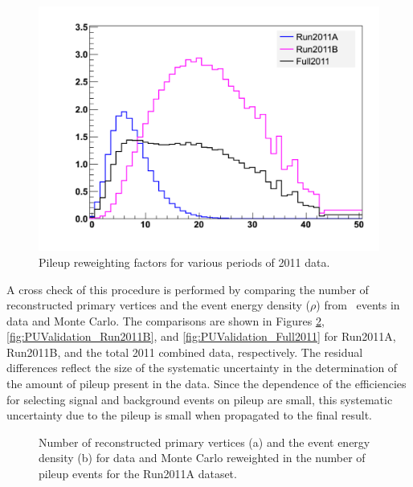 \begin{figure}[hbt]
\begin{center}
\includegraphics[width=0.7\linewidth]{figures/ReweightingFactors.pdf}
\caption{\label{fig:PUReweightingFactors} Pileup reweighting factors for various periods of 2011 data.}
\end{center}
\end{figure}


A cross check of this procedure is performed by comparing the number of 
reconstructed primary vertices and the event energy density ($\rho$)
from \zmm\ events in data and Monte Carlo. The comparisons are shown in
Figures \ref{fig:PUValidation_Run2011A},\ref{fig:PUValidation_Run2011B},
and \ref{fig:PUValidation_Full2011} for Run2011A, Run2011B, and the 
total 2011 combined data, respectively. The residual differences 
reflect the size of the systematic uncertainty in the determination 
of the amount of pileup present in the data. Since the dependence 
of the efficiencies for selecting signal and background events on 
pileup are small, this systematic uncertainty due to the pileup 
is small when propagated to the final 
result.

\begin{figure}[hbt]
\begin{center}
\caption{\label{fig:PUValidation_Run2011A} Number of reconstructed primary vertices (a) and
the event energy density (b) for data and Monte Carlo reweighted in the number
of pileup events for the Run2011A dataset.}
\end{center}
\end{figure}

